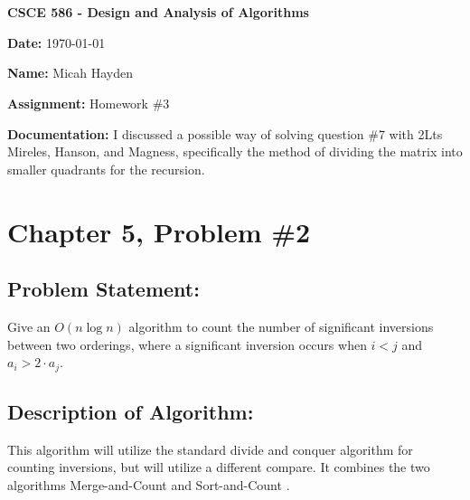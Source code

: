 \documentclass{article}
\begin{document}
\section*{} %
\noindent \textbf{CSCE 586 - Design and Analysis of Algorithms}

\noindent \textbf{Date:}  \today 

\noindent \textbf{Name:}  Micah Hayden

\noindent \textbf{Assignment:}  Homework \#3

\noindent \textbf{Documentation:}  I discussed a possible way of solving question \#7 with 2Lts Mireles, Hanson, and Magness, specifically the method of dividing the matrix into smaller quadrants for the recursion.

\hrulefill


\section*{Chapter 5, Problem \#2}

\subsection*{Problem Statement:}  
Give an $O(n \log{n})$ algorithm to count the number of significant inversions between two orderings, where a significant inversion occurs when  $i < j$ and $a_i > 2 \cdot a_j$.

\subsection*{Description of Algorithm:}
This algorithm will utilize the standard divide and conquer algorithm for counting inversions, but will utilize a different compare.  It combines the two algorithms Merge-and-Count and Sort-and-Count \cite{algDesign}.
\end{document}
